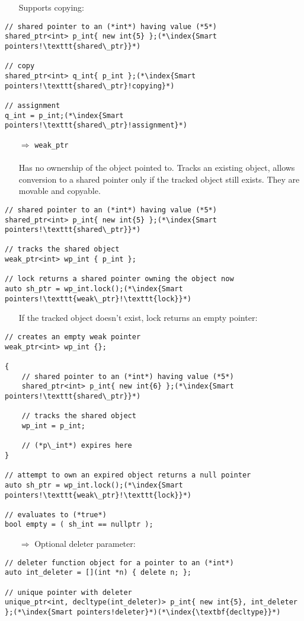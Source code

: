 \documentclass[10pt]{article}
\begin{document}
\begin{enumerate}
\item[] Supports copying:
\end{enumerate}
\begin{lstlisting}
// shared pointer to an (*int*) having value (*5*)
shared_ptr<int> p_int{ new int{5} };(*\index{Smart pointers!\texttt{shared\_ptr}}*)

// copy
shared_ptr<int> q_int{ p_int };(*\index{Smart pointers!\texttt{shared\_ptr}!copying}*)

// assignment
q_int = p_int;(*\index{Smart pointers!\texttt{shared\_ptr}!assignment}*)
\end{lstlisting}
\begin{enumerate}
\item[$\Rightarrow$] \texttt{weak\_ptr}\\ \\
Has no ownership of the object pointed to. Tracks an existing object, allows conversion to a shared pointer only if the tracked object still exists. They are movable and copyable. 
\end{enumerate}
\begin{lstlisting}
// shared pointer to an (*int*) having value (*5*)
shared_ptr<int> p_int{ new int{5} };(*\index{Smart pointers!\texttt{shared\_ptr}}*)

// tracks the shared object
weak_ptr<int> wp_int { p_int };

// lock returns a shared pointer owning the object now
auto sh_ptr = wp_int.lock();(*\index{Smart pointers!\texttt{weak\_ptr}!\texttt{lock}}*)
\end{lstlisting}
\begin{enumerate}
\item[] If the tracked object doesn't exist, lock returns an empty pointer:
\end{enumerate}
\begin{lstlisting}
// creates an empty weak pointer
weak_ptr<int> wp_int {};

{
    // shared pointer to an (*int*) having value (*5*)
    shared_ptr<int> p_int{ new int{6} };(*\index{Smart pointers!\texttt{shared\_ptr}}*)

    // tracks the shared object
    wp_int = p_int;
    
    // (*p\_int*) expires here
}

// attempt to own an expired object returns a null pointer
auto sh_ptr = wp_int.lock();(*\index{Smart pointers!\texttt{weak\_ptr}!\texttt{lock}}*)

// evaluates to (*true*)
bool empty = ( sh_int == nullptr );
\end{lstlisting}
\begin{enumerate}
\item[$\Rightarrow$] Optional deleter parameter:
\end{enumerate}
\begin{lstlisting}
// deleter function object for a pointer to an (*int*)
auto int_deleter = [](int *n) { delete n; };

// unique pointer with deleter
unique_ptr<int, decltype(int_deleter)> p_int{ new int{5}, int_deleter };(*\index{Smart pointers!deleter}*)(*\index{\textbf{decltype}}*)
\end{lstlisting}
%
%
\end{document}

